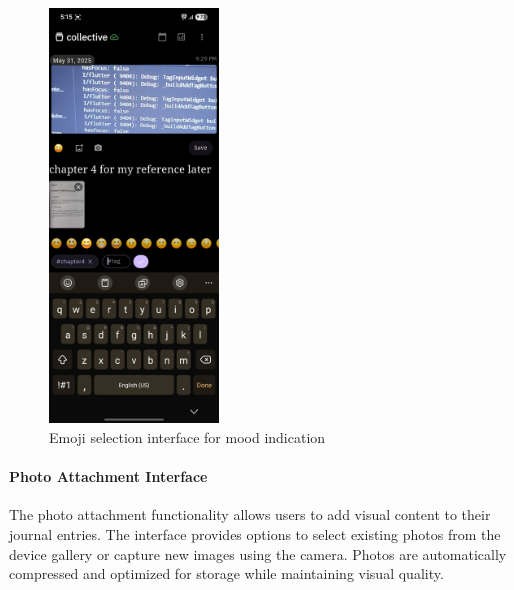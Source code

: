 \begin{figure}[H]
\centering
\includegraphics[width=0.4\textwidth]{files/imgs/prototype/emoji_selection.jpeg}
\caption{Emoji selection interface for mood indication}
\label{fig:emoji-selection}
\end{figure}

\paragraph{Photo Attachment Interface}

The photo attachment functionality allows users to add visual content to their journal entries. The interface provides options to select existing photos from the device gallery or capture new images using the camera. Photos are automatically compressed and optimized for storage while maintaining visual quality.

